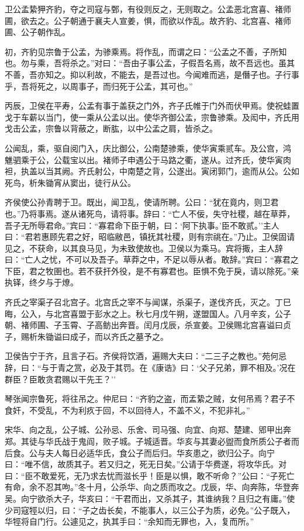 \documentclass[]{article}
\begin{document}
卫公孟絷狎齐豹，夺之司寇与鄄，有役则反之，无则取之。公孟恶北宫喜、褚师圃，欲去之。公子朝通于襄夫人宣姜，惧，而欲以作乱。故齐豹、北宫喜、褚师圃、公子朝作乱。

初，齐豹见宗鲁于公孟，为骖乘焉。将作乱，而谓之曰：``公孟之不善，子所知也。勿与乘，吾将杀之。''对曰：``吾由子事公孟，子假吾名焉，故不吾远也。虽其不善，吾亦知之。抑以利故，不能去，是吾过也。今闻难而逃，是僭子也。子行事乎，吾将死之，以周事子，而归死于公孟，其可也。''

丙辰，卫侯在平寿，公孟有事于盖获之门外，齐子氏帷于门外而伏甲焉。使祝蛙置戈于车薪以当门，使一乘从公孟以出。使华齐御公孟，宗鲁骖乘。及闳中，齐氏用戈击公孟，宗鲁以背蔽之，断肱，以中公孟之肩，皆杀之。

公闻乱，乘，驱自阅门入，庆比御公，公南楚骖乘，使华寅乘贰车。及公宫，鸿\\
魋驷乘于公，公载宝以出。褚师子申遇公于马路之衢，遂从。过齐氏，使华寅肉袒，执盖以当其阙。齐氏射公，中南楚之背，公遂出。寅闭郭门，逾而从公。公如死鸟，析朱锄宵从窦出，徒行从公。

齐侯使公孙青聘于卫。既出，闻卫乱，使请所聘。公曰：``犹在竟内，则卫君也。''乃将事焉。遂从诸死鸟，请将事。辞曰：``亡人不佞，失守社稷，越在草莽，吾子无所辱君命。''宾曰：``寡君命下臣于朝，曰：`阿下执事。'臣不敢贰。''主人曰：``君若惠顾先君之好，昭临敝邑，镇抚其社稷，则有宗祧在。''乃止。卫侯固请见之，不获命，以其良马见，为未致使故也。卫侯以为乘马。宾将掫，主人辞曰：``亡人之忧，不可以及吾子。草莽之中，不足以辱从者。敢辞。''宾曰：``寡君之下臣，君之牧圉也。若不获扞外役，是不有寡君也。臣惧不免于戾，请以除死。''亲执铎，终夕与于燎。

齐氏之宰渠子召北宫子。北宫氏之宰不与闻谋，杀渠子，遂伐齐氏，灭之。丁巳晦，公入，与北宫喜盟于彭水之上。秋七月戊午朔，遂盟国人。八月辛亥，公子朝、褚师圃、子玉霄、子高鲂出奔晋。闰月戊辰，杀宣姜。卫侯赐北宫喜谥曰贞子，赐析朱锄谥曰成子，而以齐氏之墓予之。

卫侯告宁于齐，且言子石。齐侯将饮酒，遍赐大夫曰：``二三子之教也。''苑何忌辞，曰：``与于青之赏，必及于其罚。在《康诰》曰：`父子兄弟，罪不相及。'况在群臣？臣敢贪君赐以干先王？''

琴张闻宗鲁死，将往吊之。仲尼曰：``齐豹之盗，而孟絷之贼，女何吊焉？君子不食奸，不受乱，不为利疚于回，不以回待人，不盖不义，不犯非礼。''

宋华、向之乱，公子城、公孙忌、乐舍、司马强、向宜、向郑、楚建、郳甲出奔郑。其徒与华氏战于鬼阎，败子城。子城适晋。华亥与其妻必盥而食所质公子者而后食。公与夫人每日必适华氏，食公子而后归。华亥患之，欲归公子。向宁曰：``唯不信，故质其子。若又归之，死无日矣。''公请于华费遂，将攻华氏。对曰：``臣不敢爱死，无乃求去忧而滋长乎！臣是以惧，敢不听命？''公曰：``子死亡有命，余不忍其呴。''冬十月，公杀华、向之质而攻之。戊辰，华、向奔陈，华登奔吴。向宁欲杀大子，华亥曰：``干君而出，又杀其子，其谁纳我？且归之有庸。''使少司寇牼以归，曰：``子之齿长矣，不能事人，以三公子为质，必免。''公子既入，华牼将自门行。公遽见之，执其手曰：``余知而无罪也，入，复而所。''
\end{document}
